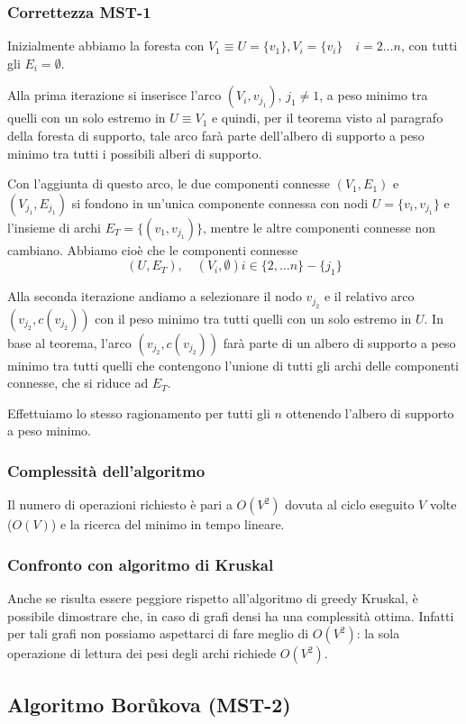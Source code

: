 \documentclass[../template]{subfiles}
\begin{document}
\subsubsection{Correttezza MST-1}
Inizialmente abbiamo la foresta con $V_1 \equiv U = \{v_1\}, V_i = \{v_i\} \quad i=2\ldots n$, con tutti gli $E_i = \emptyset$.

Alla prima iterazione si inserisce l'arco $(V_i, v_{j_1})$, $j_1 \neq 1$, a peso minimo tra quelli con un solo estremo in $U \equiv V_1$
e quindi, per il teorema visto al paragrafo della foresta di supporto, tale arco farà parte dell'albero di supporto a peso minimo
tra tutti i possibili alberi di supporto.

Con l'aggiunta di questo arco, le due componenti connesse $(V_1, E_1)$ e $(V_{j_1}, E_{j_1})$ si fondono in un'unica componente
connessa con nodi $U = \{v_i, v_{j_1}\}$ e l'insieme di archi $E_T = \{(v_1, v_{j_1})\}$, mentre le altre componenti connesse non cambiano.
Abbiamo cioè che le componenti connesse
\[(U, E_T), \quad (V_i, \emptyset) i \in \{2,\ldots n\} - \{j_1\}\]

Alla seconda iterazione andiamo a selezionare il nodo $v_{j_2}$ e il relativo arco $( v_{j_2}, c(v_{j_2}))$ con il peso minimo
tra tutti quelli con un solo estremo in $U$.
In base al teorema, l'arco $(v_{j_2}, c(v_{j_2}))$ farà parte di un albero di supporto a peso minimo tra tutti quelli che contengono
l'unione di tutti gli archi delle componenti connesse, che si riduce ad $E_T$.

Effettuiamo lo stesso ragionamento per tutti gli $n$ ottenendo l'albero di supporto a peso minimo.
\subsubsection{Complessità dell'algoritmo}
Il numero di operazioni richiesto è pari a $O(V^2)$ dovuta al ciclo eseguito $V$ volte ($O(V)$) e la ricerca del minimo in tempo lineare.

\subsubsection{Confronto con algoritmo di Kruskal}
Anche se risulta essere peggiore rispetto all'algoritmo di greedy Kruskal, è possibile dimostrare che, in caso di grafi densi
ha una complessità ottima.
Infatti per tali grafi non possiamo aspettarci di fare meglio di $O(V^2)$: la sola operazione di lettura dei pesi
degli archi richiede $O(V^2)$.

\subsection{Algoritmo Borůkova (MST-2)}

\end{document}
